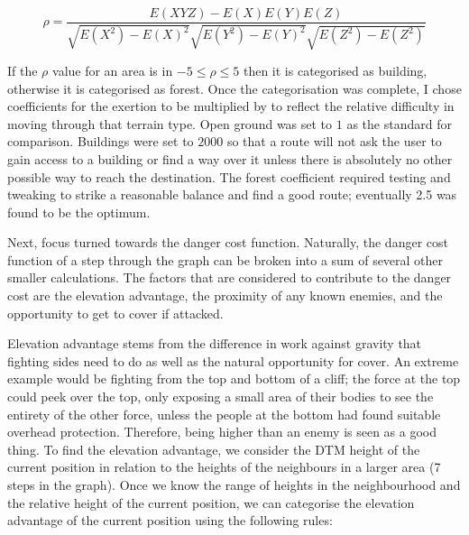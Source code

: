 \documentclass[12pt,a4paper]{article}
\begin{document}
  \begin{equation*}
    \rho = \frac{E(XYZ) - E(X)E(Y)E(Z)}{\sqrt{E(X^{2}) - E(X)^{2}}\sqrt{E(Y^{2}) - E(Y)^{2}}\sqrt{E(Z^{2})-E(Z^{2})}}
  \end{equation*}

  \par If the $\rho$ value for an area is in $-5 \leq \rho \leq 5$ then it is categorised as building, otherwise it is categorised as forest. Once the categorisation was complete, I chose coefficients for the exertion to be multiplied by to reflect the relative difficulty in moving through that terrain type. Open ground was set to $1$ as the standard for comparison. Buildings were set to $2000$ so that a route will not ask the user to gain access to a building or find a way over it unless there is absolutely no other possible way to reach the destination. The forest coefficient required testing and tweaking to strike a reasonable balance and find a good route; eventually 2.5 was found to be the optimum.
  \par Next, focus turned towards the danger cost function. Naturally, the danger cost function of a step through the graph can be broken into a sum of several other smaller calculations. The factors that are considered to contribute to the danger cost are the elevation advantage, the proximity of any known enemies, and the opportunity to get to cover if attacked.
  \par Elevation advantage stems from the difference in work against gravity that fighting sides need to do as well as the natural opportunity for cover. An extreme example would be fighting from the top and bottom of a cliff; the force at the top could peek over the top, only exposing a small area of their bodies to see the entirety of the other force, unless the people at the bottom had found suitable overhead protection. Therefore, being higher than an enemy is seen as a good thing. To find the elevation advantage, we consider the DTM height of the current position in relation to the heights of the neighbours in a larger area (7 steps in the graph). Once we know the range of heights in the neighbourhood and the relative height of the current position, we can categorise the elevation advantage of the current position using the following rules:
\end{document}
